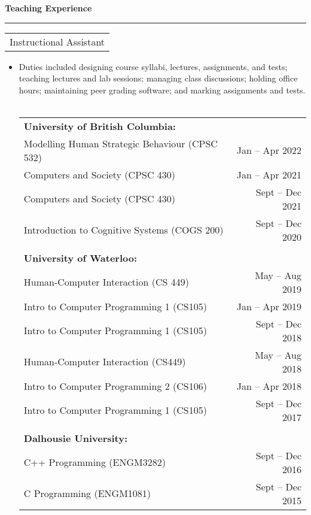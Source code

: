 \documentclass{article}
\newcommand{\heading}[1]
{
	\vspace{3pt}
	\textbf{#1} 
	\vspace{-6pt}
	
	\rule{\linewidth}{0.4pt}
}
\begin{document}
\heading{Teaching Experience}
\begin{tabularx}{\textwidth}{X}
	Instructional Assistant
\end{tabularx}
\begin{itemize}
	\item Duties included designing course syllabi, lectures, assignments, and tests; teaching lectures and lab sessions; managing class discussions; holding office hours; maintaining peer grading software; and marking assignments and tests. \\~\\
	\begin{tabularx}{\linewidth}{Xr}
		\textbf{University of British Columbia:}	\\
		Modelling Human Strategic Behaviour (CPSC 532) & Jan -- Apr 2022 \\
		Computers and Society (CPSC 430) & Jan -- Apr 2021 \\
		Computers and Society (CPSC 430) & Sept -- Dec 2021 \\
		Introduction to Cognitive Systems (COGS 200) & Sept -- Dec 2020 \\
		\\
		\textbf{University of Waterloo:}	\\
		Human-Computer Interaction (CS 449) & May -- Aug 2019 \\
		Intro to Computer Programming 1 (CS105) & Jan -- Apr 2019 \\
		Intro to Computer Programming 1 (CS105) & Sept -- Dec 2018 \\
		Human-Computer Interaction (CS449) & May -- Aug 2018 \\
		Intro to Computer Programming 2 (CS106) & Jan -- Apr 2018 \\
		Intro to Computer Programming 1 (CS105) & Sept -- Dec 2017 \\
		\\
		\textbf{Dalhousie University:}	\\
		C++ Programming (ENGM3282) & Sept -- Dec 2016 \\ 
		C Programming (ENGM1081) & Sept -- Dec 2015 \\
	\end{tabularx} ~\\
\end{itemize}
\end{document}
